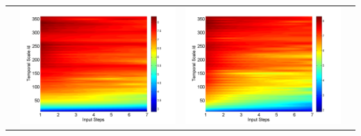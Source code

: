 \documentclass[draft,wrr]{AGUTeX}
\begin{document}
\begin{article}
\begin{table}[H]
\begin{tabular}{cccc}
&\begin{minipage}{.3\textwidth}\includegraphics[width=\linewidth]{resultgraph/05585000p_abs.png}\end{minipage}
&\begin{minipage}{.3\textwidth}\includegraphics[width=\linewidth]{resultgraph/05585000pep_abs.png}\end{minipage}

\end{tabular}
\end{table}
\end{article}
\end{document}

